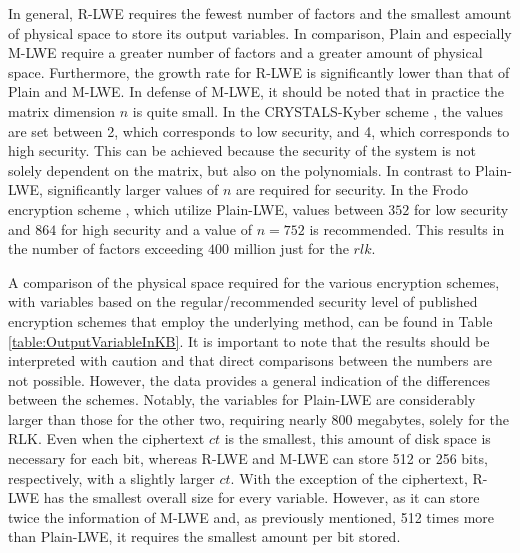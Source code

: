 In general, R-LWE requires the fewest number of factors and the smallest amount of physical space to store its output variables. In comparison, Plain and especially M-LWE require a greater number of factors and a greater amount of physical space. Furthermore, the growth rate for R-LWE is significantly lower than that of Plain and M-LWE. In defense of M-LWE, it should be noted that in practice the matrix dimension $n$ is quite small. In the CRYSTALS-Kyber scheme \cite{CyrstalsKyber}, the values are set between 2, which corresponds to low security, and 4, which corresponds to high security. This can be achieved because the security of the system is not solely dependent on the matrix, but also on the polynomials. In contrast to Plain-LWE, significantly larger values of $n$ are required for security. In the Frodo encryption scheme \cite{frodo}, which utilize Plain-LWE, values between $352$ for low security and $864$ for high security and a value of $n=752$ is recommended. This results in the number of factors exceeding $400$ million just for the $rlk$.

A comparison of the physical space required for the various encryption schemes, with variables based on the regular/recommended security level of published encryption schemes that employ the underlying method, can be found in Table \ref{table:OutputVariableInKB}. It is important to note that the results should be interpreted with caution and that direct comparisons between the numbers are not possible. However, the data provides a general indication of the differences between the schemes. Notably, the variables for Plain-LWE are considerably larger than those for the other two, requiring nearly 800 megabytes, solely for the RLK. Even when the ciphertext $ct$ is the smallest, this amount of disk space is necessary for each bit, whereas R-LWE and M-LWE can store 512 or 256 bits, respectively, with a slightly larger $ct$. With the exception of the ciphertext, R-LWE has the smallest overall size for every variable. However, as it can store twice the information of M-LWE and, as previously mentioned, 512 times more than Plain-LWE, it requires the smallest amount per bit stored.

